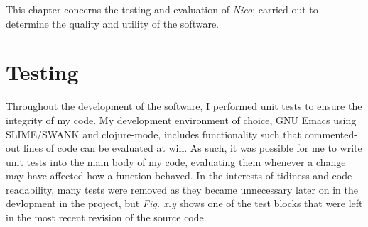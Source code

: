 \documentclass[12pt,twoside,notitlepage,xetex]{report}
\begin{document}
This chapter concerns the testing and evaluation of \emph{Nico}; carried out to determine the quality and utility of the software.

\section{Testing}%

Throughout the development of the software, I performed unit tests to ensure
the integrity of my code.  My development environment of choice, GNU Emacs
using SLIME/SWANK and clojure-mode, includes functionality such that
commented-out lines of code can be evaluated at will.  As such, it was possible
for me to write unit tests into the main body of my code, evaluating them
whenever a change may have affected how a function behaved.  In the interests
of tidiness and code readability, many tests were removed as they became
unnecessary later on in the devlopment in the project, but \emph{Fig. x.y}
shows one of the test blocks that were left in the most recent revision of the
source code.
\end{document}
